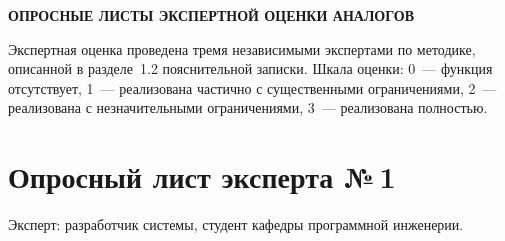 
\begin{center}
\textbf{ОПРОСНЫЕ ЛИСТЫ ЭКСПЕРТНОЙ ОЦЕНКИ АНАЛОГОВ}
\end{center}

\vspace{1em}

Экспертная оценка проведена тремя независимыми экспертами по методике, описанной в разделе~1.2 пояснительной записки. Шкала оценки: 0~--- функция отсутствует, 1~--- реализована частично с существенными ограничениями, 2~--- реализована с незначительными ограничениями, 3~--- реализована полностью.

\section{Опросный лист эксперта №\,1}

Эксперт: разработчик системы, студент кафедры программной инженерии.

